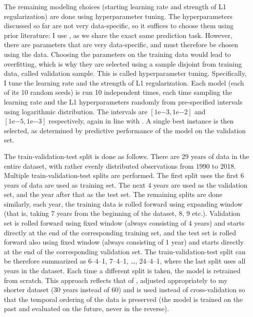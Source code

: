 		The remaining modeling choices (starting learning rate and strength of L1 regularization) are done using hyperparameter tuning. The hyperparameters discussed so far are not very data-specific, so it suffices to choose them using prior literature: I use \cite{gu2020empirical}, as we share the exact same prediction task. However, there are parameters that are very data-specific, and must therefore be chosen using the data. Choosing the parameters on the training data would lead to overfitting, which is why they are selected using a sample disjoint from training data, called validation sample. This is called hyperparameter tuning. Specifically, I tune the learning rate and the strength of L1 regularization. Each model (each of its 10 random seeds) is run 10 independent times, each time sampling the learning rate and the L1 hyperparameters randomly from pre-specified intervals using logarithmic distribution. The intervals are $\left[1\mathrm{e}{-3}, 1\mathrm{e}{-2}\right]$ and $\left[1\mathrm{e}{-5}, 1\mathrm{e}{-3}\right]$ respectively, again in line with \cite{gu2020empirical}. A single best instance is then selected, as determined by predictive performance of the model on the validation set.
		
		The train-validation-test split is done as follows. There are 29 years of data in the entire dataset, with rather evenly distributed observations from 1990 to 2018. Multiple train-validation-test splits are performed. The first split uses the first 6 years of data are used as training set. The next 4 years are used as the validation set, and the year after that as the test set. The remaining splits are done similarly, each year, the training data is rolled forward using expanding window (that is, taking 7 years from the beginning of the dataset, 8, 9 etc.). Validation set is rolled forward using fixed window (always consisting of 4 years) and starts directly at the end of the corresponding training set, and the test set is rolled forward also using fixed window (always consisting of 1 year) and starts directly at the end of the corresponding validation set. The train-validation-test split can be therefore summarized as 6--4--1, 7--4--1, \ldots, 24--4--1,  where the last split uses all years in the dataset. Each time a different split is taken, the model is retrained from scratch. This approach reflects that of \cite{gu2020empirical}, adjusted appropriately to my shorter dataset (30 years instead of 60) and is used instead of cross-validation so that the temporal ordering of the data is preserved (the model is trained on the past and evaluated on the future, never in the reverse).    
	
